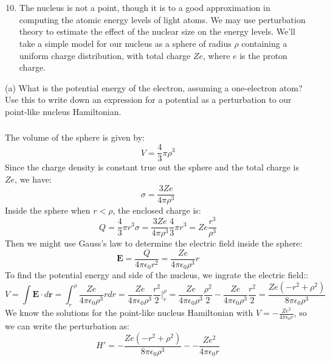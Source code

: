 \documentclass[12pt]{article}
\begin{document}
\section{}
\begin{enumerate}
  \setcounter{enumi}{9}
  \item The nucleus is not a point, though it is to a good approximation in computing the atomic energy levels of light atoms. We may use perturbation theory to estimate the effect of the nuclear size on the energy levels. We'll take a simple model for our nucleus as a sphere of radius $\rho$ containing a uniform charge distribution, with total charge $Z e$, where $e$ is the proton charge.
\end{enumerate}

(a) What is the potential energy of the electron, assuming a one-electron atom? Use this to write down an expression for a potential as a perturbation to our point-like nucleus Hamiltonian.
\subsubsection{}
The volume of the sphere is given by:
\begin{equation}
  V = \frac{4}{3} \pi \rho^3
\end{equation}
Since the charge density is constant true out the sphere and the total charge is $Ze$, we have:
\begin{equation}
  \sigma  = \frac{3Ze}{4\pi\rho^3}
\end{equation}
Inside the sphere when $r < \rho$, the enclosed charge is:
\begin{equation}
  Q = \frac{4}{3} \pi r^3 \sigma = \frac{3Ze}{4\pi\rho^3} \frac{4}{3} \pi r^3 = Ze \frac{r^3}{\rho^3}
\end{equation}
Then we might use Gauss's law to determine the electric field inside the sphere:
\begin{equation}
  \mathbf{E} = \frac{Q}{4\pi\epsilon_0 r^2} = \frac{Ze}{4\pi\epsilon_0\rho^3} r
\end{equation}
To find the potential energy and side of the nucleus, we ingrate the electric field::
\begin{equation}
  V = \int \mathbf{E} \cdot d\mathbf{r} = \int_{r}^{\rho } \frac{Ze}{4\pi\epsilon_0\rho^3} r dr = \frac{Ze}{4\pi\epsilon_0\rho^3} \frac{r^2}{2} \Big|_{r}^{\rho} = \frac{Ze}{4\pi\epsilon_0\rho^3} \frac{\rho^2}{2} - \frac{Ze}{4\pi\epsilon_0\rho^3} \frac{r^2}{2} = \frac{Ze(-r^2 + \rho^2)}{8\pi\epsilon_0\rho^3}
\end{equation}
We know the solutions for the point-like nucleus Hamiltonian with $V = -\frac{Ze^2}{4\pi\epsilon_0 r}$, so we can write the perturbation as:
\begin{equation}
  H' = -\frac{Ze(-r^2 + \rho^2)}{8\pi\epsilon_0\rho^3} - -\frac{Ze^2}{4\pi\epsilon_0 r}
\end{equation}
\end{document}
